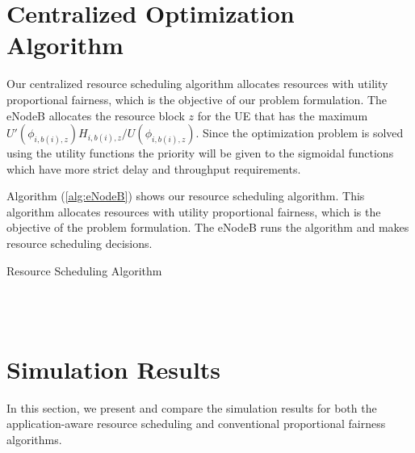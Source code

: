 \documentclass[conference]{IEEEtran}
\begin{document}
\section{Centralized Optimization Algorithm}\label{sec:Algorithm}
Our centralized resource scheduling algorithm allocates resources with utility proportional fairness, which is the objective of our problem formulation. The eNodeB allocates the resource block $z$ for the UE that has the maximum $U'(\phi_{i,b(i),z})H_{i,b(i),z}/ U(\phi_{i,b(i),z})$. Since the optimization problem is solved using the utility functions the priority will be given to the sigmoidal functions which have more strict delay and throughput requirements. 

Algorithm (\ref{alg:eNodeB}) shows our resource scheduling algorithm. This algorithm allocates resources with utility proportional fairness, which is the objective of the problem formulation. The eNodeB runs the algorithm and makes resource scheduling decisions.  

\begin{algorithm}
\caption{Resource Scheduling Algorithm}\label{alg:eNodeB}
\begin{algorithmic}
	 \\
	 \\
\ENDIF 
\ENDFOR
\end{algorithmic}
\end{algorithm}

\section{Simulation Results}\label{sec:sim}

In this section, we present and compare the simulation results for both the application-aware resource scheduling and conventional proportional fairness algorithms. 
\end{document}
